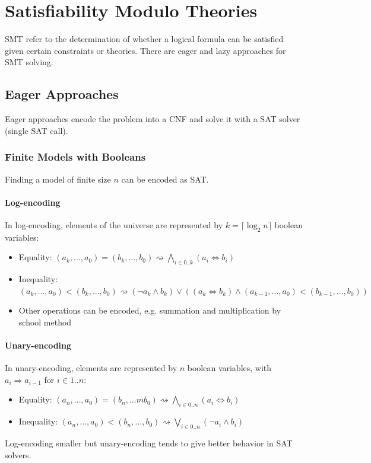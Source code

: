 \documentclass[10pt,a4paper]{report}
\begin{document}
\chapter{Satisfiability Modulo Theories}
SMT refer to the determination of whether a logical formula can be satisfied given certain constraints or theories. There are eager and lazy approaches for SMT solving.
\section{Eager Approaches}
Eager approaches encode the problem into a CNF and solve it with a SAT solver (single SAT call).
\subsection{Finite Models with Booleans}
Finding a model of finite size $n$ can be encoded as SAT.
\subsubsection{Log-encoding}
In log-encoding, elements of the universe are represented by $k = \lceil \log_2 n\rceil$ boolean variables:
\begin{itemize}
    \item Equality: $(a_k, ..., a_0) = (b_k, ..., b_0) \rightsquigarrow \bigwedge_{i \in 0..k} (a_i \Leftrightarrow b_i)$
    \item Inequality: $(a_k, ..., a_0) < (b_k, ..., b_0) \rightsquigarrow (\lnot a_k \land b_k) \lor ((a_k \Leftrightarrow b_k) \land (a_{k-1}, ..., a_0) < (b_{k-1}, ..., b_0))$
    \item Other operations can be encoded, e.g. summation and multiplication by school method
\end{itemize}
\subsubsection{Unary-encoding}
In unary-encoding, elements are represented by $n$ boolean variables, with $a_i \Rightarrow a_{i-1}$ for $i \in 1..n$:
\begin{itemize}
    \item Equality: $(a_n, ..., a_0) = (b_n, ...m b_0) \rightsquigarrow \bigwedge_{i \in 0..n} (a_i \Leftrightarrow b_i)$
    \item Inequality: $(a_n, ..., a_0) < (b_n, ..., b_0) \rightsquigarrow \bigvee_{i \in 0..n} (\lnot a_i \land b_i)$
\end{itemize}
Log-encoding smaller but unary-encoding tends to give better behavior in SAT solvers.
\end{document}
